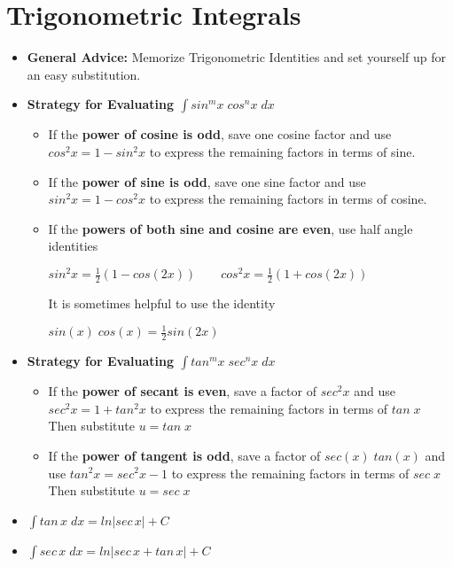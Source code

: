 \documentclass{report}
\begin{document}
	\section{Trigonometric Integrals}
		\begin{itemize}\addtolength{\leftskip}{2em}
			\item \textbf{General Advice:} Memorize Trigonometric Identities and set yourself up for an easy substitution.
			\item \textbf{Strategy for Evaluating \large$\int sin^mx\;cos^nx\;dx$}
				\begin{itemize}\addtolength{\leftskip}{4em}
					\item If the \textbf{power of cosine is odd}, save one cosine factor and use $cos^2x=1-sin^2x$ to express the remaining factors in terms of sine.
					\item If the\textbf{ power of sine is odd}, save one sine factor and use $sin^2x=1-cos^2x$ to express the remaining factors in terms of cosine.
					\item If the \textbf{powers of both sine and cosine are even}, use half angle identities
					\begin{center}
					$sin^2x=\frac{1}{2}(1-cos(2x))\quad\quad cos^2x=\frac{1}{2}(1+cos(2x))$
					\end{center}
					It is sometimes helpful to use the identity
					\begin{center}
					$sin(x)\;cos(x)=\frac{1}{2}sin(2x)$
					\end{center}
				\end{itemize} 
			\item \textbf{Strategy for Evaluating $\int tan^mx\;sec^nx\;dx$}
				\begin{itemize}\addtolength{\leftskip}{4em}
					\item If the \textbf{power of secant is even}, save a factor of $sec^2x$ and use $sec^2x=1+tan^2x$ to express the remaining factors in terms of $tan\;x$
					Then substitute $u=tan\;x$
					\item If the \textbf{power of tangent is odd}, save a factor of $sec(x)\;tan(x)$ and use $tan^2x=sec^2x-1$ to express the remaining factors in terms of $sec\;x$
					Then substitute $u=sec\;x$
				\end{itemize}
			\item \large$\int tan\,x\;dx=ln|sec\,x|+C$
			\item \large$\int sec\,x\;dx=ln|sec\,x+tan\,x|+C$
		\end{itemize}
\end{document}
